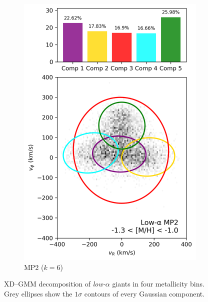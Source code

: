 \documentclass[a4paper,12pt]{article}
\begin{document}
\begin{figure}[H]
\begin{subfigure}{0.24\linewidth}
    \includegraphics[width=\linewidth]{../figures/gmm_mp2_low_alpha_k6.png}
    \caption{MP2 ($k{=}6$)}
    \label{fig:gmm_mp2_lo}
  \end{subfigure}

  \caption{XD–GMM decomposition of \emph{low-}$\alpha$ giants in four metallicity
           bins.  Grey ellipses show the $1\sigma$ contours of every Gaussian component.}
  \label{fig:gmm_lowalpha_panel}
\end{figure}
\end{document}
